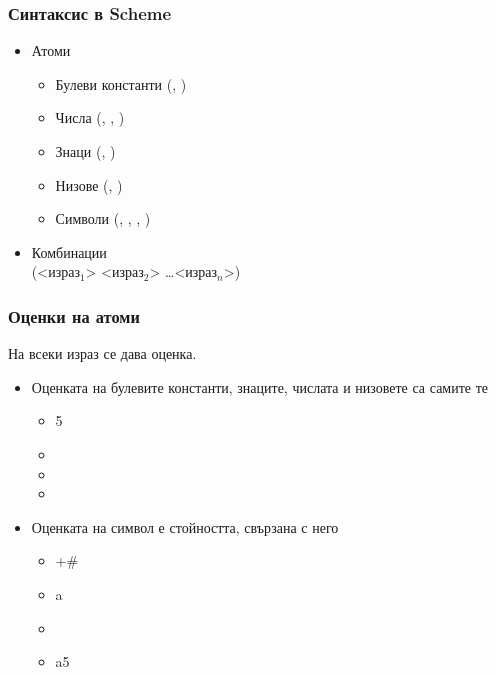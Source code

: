 \documentclass{beamer}
\begin{document}
\begin{frame}[fragile]
  \frametitle{Синтаксис в Scheme}

  \begin{itemize}
  \item Атоми
    \begin{itemize}
    \item Булеви константи (, )
    \item Числа (, , )
    \item Знаци (\lst{#\a}, \lst{#\newline})
    \item Низове (, )
    \item Символи (, , \lst{+}, )
    \end{itemize}
  \item Комбинации\\[1em]
    \alert({}<израз$_1$> <израз$_2$> \ldots <израз$_n$>\alert)
  \end{itemize}
\end{frame}

\begin{frame}[fragile]
  \frametitle{Оценки на атоми}

  На всеки израз се дава оценка.
  \begin{itemize}[<+->]
  \item Оценката на булевите константи, знаците, числата и низовете са самите те
    \begin{itemize}
    \item {} 5
    \item {}
    \item {}
    \item {}
    \end{itemize}
  \item Оценката на символ е стойността, свързана с него
    \begin{itemize}
    \item \evalsto +{\#<procedure:+>}
    \item \evalstoerr a
    \item {}
    \item \evalsto a5
    \end{itemize}
  \end{itemize}
\end{frame}
\end{document}
